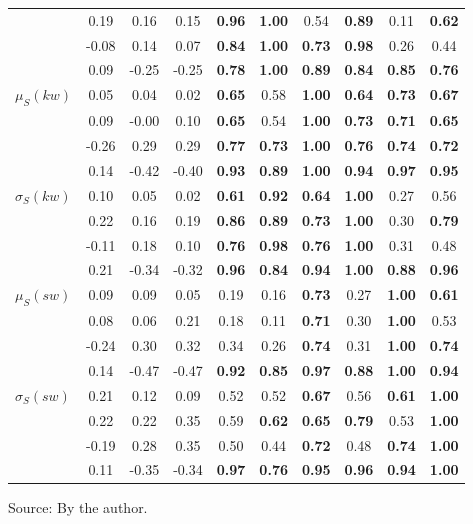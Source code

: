 \begin{table*}[h!]
\begin{center}
\begin{tabular}{| l || c | c | c | c | c | c | c | c | c |}
 & 0.19 & 0.16 & 0.15 & {\bf 0.96} & {\bf 1.00} & 0.54 & {\bf 0.89} & 0.11 & {\bf 0.62} \\
 & -0.08 & 0.14 & 0.07 & {\bf 0.84} & {\bf 1.00} & {\bf 0.73} & {\bf 0.98} & 0.26 & 0.44 \\
 & 0.09 & -0.25 & -0.25 & {\bf 0.78} & {\bf 1.00} & {\bf 0.89} & {\bf 0.84} & {\bf 0.85} & {\bf 0.76} \\\hline
$\mu_S(kw)$ & 0.05 & 0.04 & 0.02 & {\bf 0.65} & 0.58 & {\bf 1.00} & {\bf 0.64} & {\bf 0.73} & {\bf 0.67} \\
 & 0.09 & -0.00 & 0.10 & {\bf 0.65} & 0.54 & {\bf 1.00} & {\bf 0.73} & {\bf 0.71} & {\bf 0.65} \\
 & -0.26 & 0.29 & 0.29 & {\bf 0.77} & {\bf 0.73} & {\bf 1.00} & {\bf 0.76} & {\bf 0.74} & {\bf 0.72} \\
 & 0.14 & -0.42 & -0.40 & {\bf 0.93} & {\bf 0.89} & {\bf 1.00} & {\bf 0.94} & {\bf 0.97} & {\bf 0.95} \\\hline
$\sigma_S(kw)$ & 0.10 & 0.05 & 0.02 & {\bf 0.61} & {\bf 0.92} & {\bf 0.64} & {\bf 1.00} & 0.27 & 0.56 \\
 & 0.22 & 0.16 & 0.19 & {\bf 0.86} & {\bf 0.89} & {\bf 0.73} & {\bf 1.00} & 0.30 & {\bf 0.79} \\
 & -0.11 & 0.18 & 0.10 & {\bf 0.76} & {\bf 0.98} & {\bf 0.76} & {\bf 1.00} & 0.31 & 0.48 \\
 & 0.21 & -0.34 & -0.32 & {\bf 0.96} & {\bf 0.84} & {\bf 0.94} & {\bf 1.00} & {\bf 0.88} & {\bf 0.96} \\\hline
$\mu_S(sw)$ & 0.09 & 0.09 & 0.05 & 0.19 & 0.16 & {\bf 0.73} & 0.27 & {\bf 1.00} & {\bf 0.61} \\
 & 0.08 & 0.06 & 0.21 & 0.18 & 0.11 & {\bf 0.71} & 0.30 & {\bf 1.00} & 0.53 \\
 & -0.24 & 0.30 & 0.32 & 0.34 & 0.26 & {\bf 0.74} & 0.31 & {\bf 1.00} & {\bf 0.74} \\
 & 0.14 & -0.47 & -0.47 & {\bf 0.92} & {\bf 0.85} & {\bf 0.97} & {\bf 0.88} & {\bf 1.00} & {\bf 0.94} \\\hline
$\sigma_S(sw)$ & 0.21 & 0.12 & 0.09 & 0.52 & 0.52 & {\bf 0.67} & 0.56 & {\bf 0.61} & {\bf 1.00} \\
 & 0.22 & 0.22 & 0.35 & 0.59 & {\bf 0.62} & {\bf 0.65} & {\bf 0.79} & 0.53 & {\bf 1.00} \\
 & -0.19 & 0.28 & 0.35 & 0.50 & 0.44 & {\bf 0.72} & 0.48 & {\bf 0.74} & {\bf 1.00} \\
 & 0.11 & -0.35 & -0.34 & {\bf 0.97} & {\bf 0.76} & {\bf 0.95} & {\bf 0.96} & {\bf 0.94} & {\bf 1.00} \\\hline
\end{tabular}
\begin{flushleft}\footnotesize
		Source: By the author.\
\end{flushleft}
\end{center}
\end{table*}
